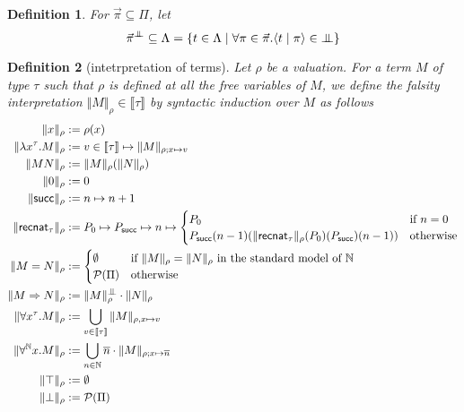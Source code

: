 \documentclass{article}
\newcommand{\successor}{\mathsf{succ}}
\newcommand{\N}{\mathbb{N}}
\newcommand{\proc}[2]{\langle{#1}\mid{#2}\rangle}
\newcommand{\depforall}[1]{\forall^\N #1.}
\newcommand{\pole}{{\bot\mkern-10mu\bot}}
\newcommand{\recnat}[1]{\mathsf{recnat}_{#1}}
\newcommand{\typeinterp}[1]{{\llbracket #1 \rrbracket}}
\newcommand{\terminterp}[2]{\Vert #1 \Vert_{#2}}
\newcommand{\powerset}[1]{\mathcal{P}(#1)}
\newtheorem{definition}{Definition}
\begin{document}
\begin{definition}
    For $\vec\pi \subseteq \Pi$, let
    \[\vec\pi^\pole \subseteq \Lambda = \{ t \in \Lambda \mid \forall \pi \in \vec\pi. \proc{t}{\pi} \in \pole \}\]
\end{definition}

\begin{definition}[intetrpretation of terms]
    Let $\rho$ be a valuation.
    For a term $M$ of type $\tau$ such that $\rho$ is defined at all the free variables of $M$, we define the falsity interpretation $\terminterp{M}{\rho} \in \typeinterp{\tau}$ by syntactic induction over $M$ as follows
    \begin{align*}
        \terminterp{x}{\rho} & := \rho(x) \\
        \terminterp{\lambda x^\tau. M}{\rho} & := v \in \typeinterp{\tau} \mapsto \terminterp{M}{\rho; x \mapsto v} \\
        \terminterp{MN}{\rho} & := \terminterp{M}{\rho}(\terminterp{N}{\rho}) \\
        \terminterp{0}{\rho} & := 0 \\
        \terminterp{\successor}{\rho} & := n \mapsto n + 1 \\
        \terminterp{\recnat{\tau}}{\rho} & := P_0 \mapsto P_\successor \mapsto n \mapsto \begin{cases} P_0 & \text{if $n = 0$} \\ P_{\successor}(n-1)(\terminterp{\recnat{\tau}}{\rho}(P_0)(P_\successor)(n-1)) & \text{otherwise} \end{cases} \\
        \terminterp{M = N}{\rho} & := \begin{cases} \emptyset & \text{if $\terminterp{M}{\rho} = \terminterp{N}{\rho}$ in the standard model of $\N$} \\
        \powerset{\Pi} & \text{otherwise} \end{cases} \\
        \terminterp{M \Rightarrow N}{\rho} & := \terminterp{M}{\rho}^\pole \cdot \terminterp{N}{\rho} \\
        \terminterp{\forall x^\tau. M}{\rho} & := \bigcup_{v \in \typeinterp{\tau}} \terminterp{M}{\rho, x \mapsto v} \\
        \terminterp{\depforall{x} M}{\rho} & := \bigcup_{n \in \N} \overline{n} \cdot \terminterp{M}{\rho; x \mapsto \overline{n}} \\
        \terminterp{\top}{\rho} & := \emptyset \\
        \terminterp{\bot}{\rho} & := \powerset{\Pi} \\
    \end{align*}
\end{definition}
\end{document}

